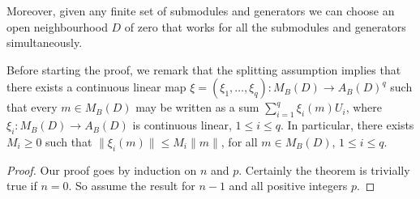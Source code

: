 Moreover, given any finite set of submodules and generators we can choose an open neighbourhood $D$ of zero that works for all the submodules and generators simultaneously.

Before starting the proof, we remark that the splitting assumption implies that there exists a continuous linear map $\xi=(\xi_1,\ldots,\xi_q):M_B(D)\to A_B(D)^q$ such that every $m\in M_B(D)$ may be written as a sum $\sum_{i=1}^q\xi_i(m)U_i$, where $\xi_i:M_B(D)\to A_B(D)$ is continuous
linear, $1\leq i\leq q$. In particular, there exists $M_i\geq0$ such that $\|\xi_i(m)\|\leq M_i\|m\|$, for all $m\in M_B(D)$, $1\leq i\leq q$.
\begin{proof}
Our proof goes by induction on $n$ and $p$. Certainly the theorem is trivially true if $n=0$. So assume the result for $n-1$ and all positive integers $p$.

\end{proof}
